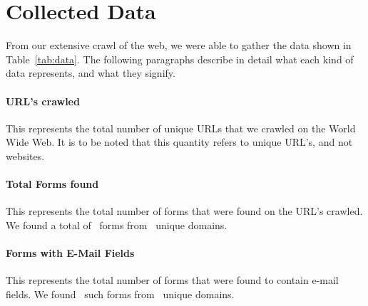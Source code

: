 \section{Collected Data}
From our extensive crawl of the web, we were able to gather the data shown in Table~\ref{tab:data}. The following paragraphs describe in detail what each kind of data represents, and what they signify.



\paragraph{URL's crawled}
This represents the total number of unique URLs that we crawled on the World Wide Web. It is to be noted that this quantity refers to unique URL's, and not websites.

\paragraph{Total Forms found}
This represents the total number of forms that were found on the URL's crawled. We found a total of \forms\ forms from 
\uniqueforms\ unique domains.

\paragraph{Forms with E-Mail Fields}
This represents the total number of forms that were found to contain e-mail fields. We found \emailforms\ such forms from \uniqueemailforms\ unique domains.
